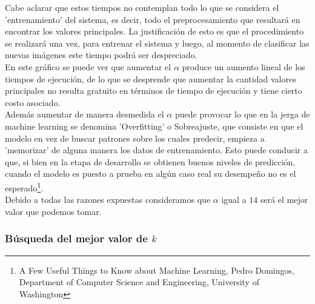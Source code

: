 Cabe aclarar que estos tiempos no contemplan todo lo que se considera el 'entrenamiento' del sistema, es decir, todo el preprocesamiento que resultará en encontrar los valores principales. La justificación de esto es que el procedimiento se realizará una vez, para entrenar el sistema y luego, al momento de clasificar las nuevas imágenes este tiempo podrá ser despreciado.
\\
En este gráfico se puede ver que aumentar el $\alpha$ produce un aumento lineal de los tiempos de ejecución, de lo que se desprende que aumentar la cantidad valores principales no resulta gratuito en términos de tiempo de ejecución y tiene cierto costo asociado.
\\
Además aumentar de manera desmedida el $\alpha$ puede provocar lo que en la jerga de machine learning se denomina 'Overfitting' o Sobreajuste, que consiste en que el modelo en vez de buscar patrones sobre los cuales predecir, empieza a 'memorizar' de alguna manera los datos de entrenamiento. Esto puede conducir a que, si bien en la etapa de desarrollo se obtienen buenos niveles de predicción, cuando el modelo es puesto a prueba en algún caso real su desempeño no es el esperado\footnote{\label{note1}A Few Useful Things to Know about Machine Learning, Pedro Domingos, Department of Computer Science and Engineering, University of Washington}.
\\
Debido a todas las razones expuestas consideramos que $\alpha$ igual a $14$ será el mejor valor que podemos tomar.
\\
\subsubsection{Búsqueda del mejor valor de $k$}

